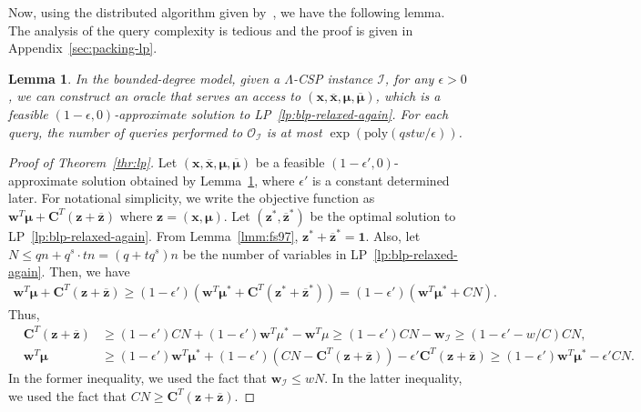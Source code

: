 \documentclass[letterpaper, 11pt]{article}
\newtheorem{lemma}[theorem]{Lemma}
\newcommand{\calI}{\mathcal{I}}
\newcommand{\calO}{\mathcal{O}}
\newcommand{\biC}{\boldsymbol{C}}
\newcommand{\biw}{\boldsymbol{w}}
\newcommand{\bix}{\boldsymbol{x}}
\newcommand{\biz}{\boldsymbol{z}}
\newcommand{\bimu}{\boldsymbol{\mu}}
\newcommand{\poly}{\mathrm{poly}}
\begin{document}
Now, using the distributed algorithm given by~\cite{KMW06}, 
we have the following lemma.
The analysis of the query complexity is tedious and the proof is given in Appendix~\ref{sec:packing-lp}.
\begin{lemma}\label{lmm:packing-lp}
  In the bounded-degree model,
  given a $\Lambda$-CSP instance $\calI$,
  for any $\epsilon>0$,
  we can construct an oracle that serves an access to $(\bix,\overline{\bix},\bimu,\overline{\bimu})$, 
  which is a feasible $(1-\epsilon,0)$-approximate solution to LP~\eqref{lp:blp-relaxed-again}.
  For each query, the number of queries performed to $\calO_{\calI}$ is at most $\exp(\poly(qstw/\epsilon))$.
\end{lemma}

\begin{proof}[Proof of Theorem~\ref{thr:lp}]
  Let $(\bix,\overline{\bix},\bimu,\overline{\bimu})$ be a feasible $(1-\epsilon',0)$-approximate solution obtained by Lemma~\ref{lmm:packing-lp},
  where $\epsilon'$ is a constant determined later.
  For notational simplicity,
  we write the objective function as $\biw^T \bimu + \biC^T(\biz+\overline{\biz})$ where $\biz=(\bix,\bimu)$.
  Let $(\biz^*,\overline{\biz}^*)$ be the optimal solution to LP~\eqref{lp:blp-relaxed-again}.
  From Lemma~\ref{lmm:fs97}, $\biz^*+\overline{\biz}^*=\mathbf{1}$.
  Also, let $N\leq qn+q^s\cdot tn= (q+tq^s)n$ be the number of variables in LP~\eqref{lp:blp-relaxed-again}.
  Then, we have
  \begin{eqnarray*}
    \biw^T \bimu +  \biC^T(\biz+\overline{\biz}) \geq (1-\epsilon')(\biw^T\bimu^*+\biC^T(\biz^*+\overline{\biz}^*)) = (1-\epsilon')(\biw^T\bimu^*+C N).
  \end{eqnarray*}
  Thus,
  \begin{eqnarray*}
    & \biC^T(\biz+\overline{\biz}) &
    \geq
    (1-\epsilon')CN + (1-\epsilon')\biw^T\mu^* - \biw^T\mu
    \geq 
    (1-\epsilon')CN - \biw_{\calI}
    \geq 
    (1-\epsilon' - w/C)CN, \\
    &\biw^T\bimu&
    \geq
    (1-\epsilon')\biw^T\bimu^* + (1-\epsilon')(CN-\biC^T(\biz+\overline{\biz})) - \epsilon' \biC^T(\biz+\overline{\biz})
    \geq
    (1-\epsilon')\biw^T\bimu^* - \epsilon'C N. 
  \end{eqnarray*}
  In the former inequality, we used the fact that $\biw_{\calI} \leq wN$.
  In the latter inequality, we used the fact that $CN \geq \biC^T(\biz+\overline{\biz})$.


\end{proof}
\end{document}
